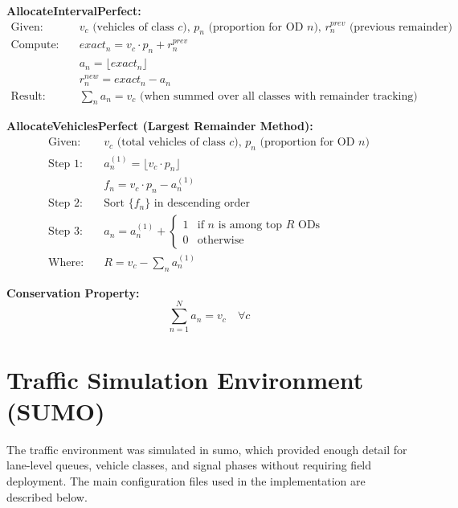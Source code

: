 \begin{algorithm}
\caption{Mathematical Formulation of largest remainder method for vehicle allocation}
\label{alg:mathematical_formulation}
\textbf{AllocateIntervalPerfect:}
\begin{align*}
\text{Given:} & \quad v_c \text{ (vehicles of class } c\text{), } p_n \text{ (proportion for OD } n\text{), } r_n^{prev} \text{ (previous remainder)} \\
\text{Compute:} & \quad exact_n = v_c \cdot p_n + r_n^{prev} \\
& \quad a_n = \lfloor exact_n \rfloor \\
& \quad r_n^{new} = exact_n - a_n \\
\text{Result:} & \quad \sum_{n} a_n = v_c \text{ (when summed over all classes with remainder tracking)}
\end{align*}

\textbf{AllocateVehiclesPerfect (Largest Remainder Method):}
\begin{align*}
\text{Given:} & \quad v_c \text{ (total vehicles of class } c\text{), } p_n \text{ (proportion for OD } n\text{)} \\
\text{Step 1:} & \quad a_n^{(1)} = \lfloor v_c \cdot p_n \rfloor \\
& \quad f_n = v_c \cdot p_n - a_n^{(1)} \\
\text{Step 2:} & \quad \text{Sort } \{f_n\} \text{ in descending order} \\
\text{Step 3:} & \quad a_n = a_n^{(1)} + 
\begin{cases}
1 & \text{if } n \text{ is among top } R \text{ ODs} \\
0 & \text{otherwise}
\end{cases} \\
\text{Where:} & \quad R = v_c - \sum_{n} a_n^{(1)}
\end{align*}

\textbf{Conservation Property:}
\[
\sum_{n=1}^{N} a_n = v_c \quad \forall c
\]
\end{algorithm}

\section{Traffic Simulation Environment (SUMO)}
\label{sec:sumo_environment}

The traffic environment was simulated in \gls{sumo}, which provided enough detail for lane-level queues, vehicle classes, and signal phases without requiring field deployment. The main configuration files used in the implementation are described below.

